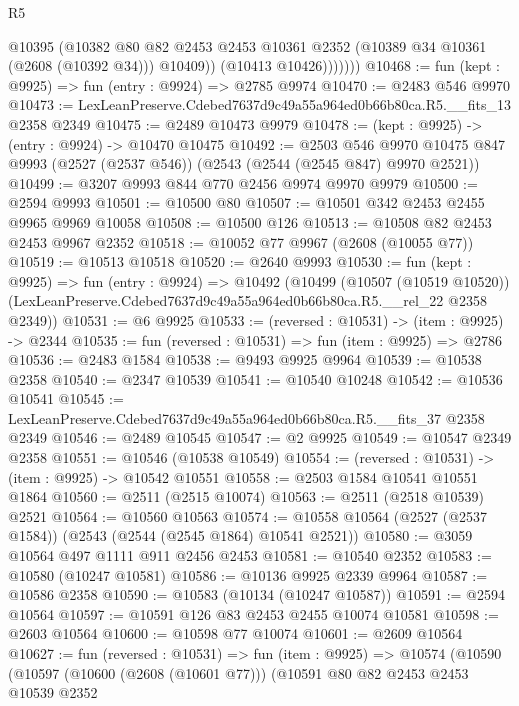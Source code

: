 \begin{lexlean}{R5}
\begin{coremodule}
                  @10395
                  (@10382
                    @80
                    @82
                    @2453
                    @2453
                    @10361
                    @2352
                    (@10389 @34 @10361 (@2608 (@10392 @34)))
                    @10409))
                (@10413 @10426)))))))
@10468 := fun (kept : @9925) => fun (entry : @9924) => @2785 @9974
@10470 := @2483 @546 @9970
@10473 := LexLeanPreserve.Cdebed7637d9c49a55a964ed0b66b80ca.R5.__fits_13 @2358 @2349
@10475 := @2489 @10473 @9979
@10478 := (kept : @9925) -> (entry : @9924) -> @10470 @10475
@10492 := @2503
    @546
    @9970
    @10475
    @847
    @9993
    (@2527 (@2537 @546))
    (@2543 (@2544 (@2545 @847) @9970 @2521))
@10499 := @3207 @9993 @844 @770 @2456 @9974 @9970 @9979
@10500 := @2594 @9993
@10501 := @10500 @80
@10507 := @10501 @342 @2453 @2455 @9965 @9969 @10058
@10508 := @10500 @126
@10513 := @10508 @82 @2453 @2453 @9967 @2352
@10518 := @10052 @77 @9967 (@2608 (@10055 @77))
@10519 := @10513 @10518
@10520 := @2640 @9993
@10530 := fun (kept : @9925) =>
  fun (entry : @9924) =>
  @10492
    (@10499
      (@10507 (@10519 @10520))
      (LexLeanPreserve.Cdebed7637d9c49a55a964ed0b66b80ca.R5.__rel_22 @2358 @2349))
@10531 := @6 @9925
@10533 := (reversed : @10531) -> (item : @9925) -> @2344
@10535 := fun (reversed : @10531) => fun (item : @9925) => @2786
@10536 := @2483 @1584
@10538 := @9493 @9925 @9964
@10539 := @10538 @2358
@10540 := @2347 @10539
@10541 := @10540 @10248
@10542 := @10536 @10541
@10545 := LexLeanPreserve.Cdebed7637d9c49a55a964ed0b66b80ca.R5.__fits_37 @2358 @2349
@10546 := @2489 @10545
@10547 := @2 @9925
@10549 := @10547 @2349 @2358
@10551 := @10546 (@10538 @10549)
@10554 := (reversed : @10531) -> (item : @9925) -> @10542 @10551
@10558 := @2503 @1584 @10541 @10551 @1864
@10560 := @2511 (@2515 @10074)
@10563 := @2511 (@2518 @10539) @2521
@10564 := @10560 @10563
@10574 := @10558 @10564 (@2527 (@2537 @1584)) (@2543 (@2544 (@2545 @1864) @10541 @2521))
@10580 := @3059 @10564 @497 @1111 @911 @2456 @2453
@10581 := @10540 @2352
@10583 := @10580 (@10247 @10581)
@10586 := @10136 @9925 @2339 @9964
@10587 := @10586 @2358
@10590 := @10583 (@10134 (@10247 @10587))
@10591 := @2594 @10564
@10597 := @10591 @126 @83 @2453 @2455 @10074 @10581
@10598 := @2603 @10564
@10600 := @10598 @77 @10074
@10601 := @2609 @10564
@10627 := fun (reversed : @10531) =>
  fun (item : @9925) =>
  @10574
    (@10590
      (@10597
        (@10600 (@2608 (@10601 @77)))
        (@10591
          @80
          @82
          @2453
          @2453
          @10539
          @2352

\end{coremodule}
\end{lexlean}
